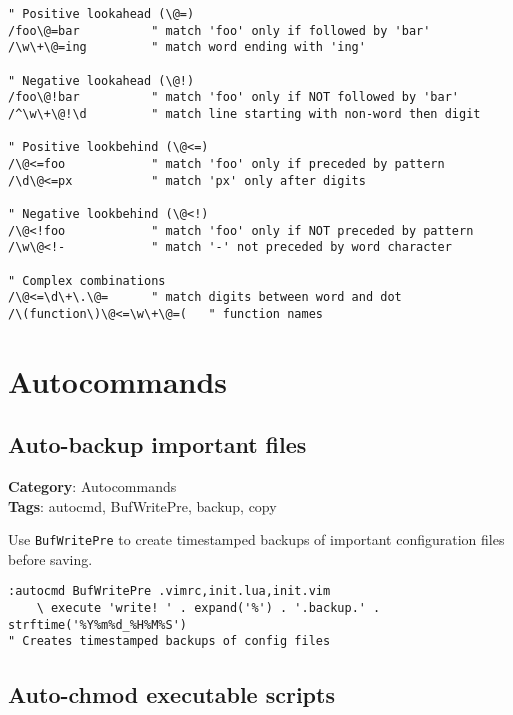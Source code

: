 \begin{Exa*}{}
\begin{Verbatim}[fontsize=\footnotesize, breaklines, breakanywhere]
" Positive lookahead (\@=)
/foo\@=bar          " match 'foo' only if followed by 'bar'
/\w\+\@=ing         " match word ending with 'ing'

" Negative lookahead (\@!)
/foo\@!bar          " match 'foo' only if NOT followed by 'bar'
/^\w\+\@!\d         " match line starting with non-word then digit

" Positive lookbehind (\@<=)
/\@<=foo            " match 'foo' only if preceded by pattern
/\d\@<=px           " match 'px' only after digits

" Negative lookbehind (\@<!)
/\@<!foo            " match 'foo' only if NOT preceded by pattern
/\w\@<!-            " match '-' not preceded by word character

" Complex combinations
/\@<=\d\+\.\@=      " match digits between word and dot
/\(function\)\@<=\w\+\@=(   " function names
\end{Verbatim}
\end{Exa*}

\chapter{Autocommands}
\section{Auto-backup important files}

\textbf{Category}: Autocommands\\ \textbf{Tags}: autocmd, BufWritePre, backup, copy
\vspace{0.5cm}

Use {\footnotesize \Verb§BufWritePre§} to create timestamped backups of important configuration files before saving.

\begin{Exa*}{}
\begin{Verbatim}[fontsize=\footnotesize, breaklines, breakanywhere]
:autocmd BufWritePre .vimrc,init.lua,init.vim 
    \ execute 'write! ' . expand('%') . '.backup.' . strftime('%Y%m%d_%H%M%S')
" Creates timestamped backups of config files
\end{Verbatim}
\end{Exa*}

\section{Auto-chmod executable scripts}

